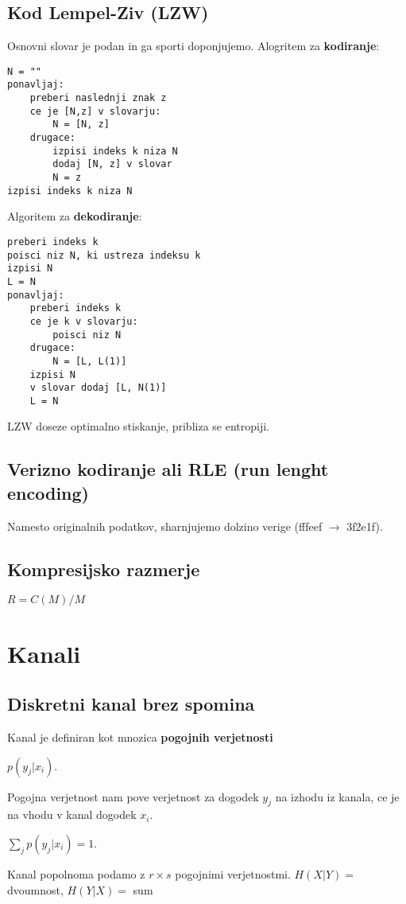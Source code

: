 \documentclass{article}
\begin{document}
\begin{multicols}{4}
	\subsection{Kod Lempel-Ziv (LZW)}
	Osnovni slovar je podan in ga sporti doponjujemo. Alogritem za \textbf{kodiranje}:
	\begin{verbatim}
N = ""
ponavljaj:
    preberi naslednji znak z
    ce je [N,z] v slovarju:
        N = [N, z]
    drugace:
        izpisi indeks k niza N
        dodaj [N, z] v slovar
        N = z
izpisi indeks k niza N
\end{verbatim}
	Algoritem za \textbf{dekodiranje}:
	\begin{verbatim}
preberi indeks k
poisci niz N, ki ustreza indeksu k
izpisi N
L = N
ponavljaj:
    preberi indeks k
    ce je k v slovarju:
        poisci niz N
    drugace:
        N = [L, L(1)]
    izpisi N
    v slovar dodaj [L, N(1)]
    L = N
\end{verbatim}
	LZW doseze optimalno stiskanje, pribliza se entropiji. %

	\subsection{Verizno kodiranje ali RLE (run lenght encoding)}
	Namesto originalnih podatkov, sharnjujemo dolzino verige (fffeef $\rightarrow$ 3f2e1f).

	\subsection{Kompresijsko razmerje}
	\begin{center}
		\begin{math}
			R = C(M) / M
		\end{math}
	\end{center}

	\section{Kanali}

	\subsection{Diskretni kanal brez spomina}
	Kanal je definiran kot mnozica \textbf{pogojnih verjetnosti}
	\begin{center}
		$p(y_j | x_i)$.
	\end{center}
	Pogojna verjetnost nam pove verjetnost za dogodek $y_j$ na izhodu iz kanala, ce je na vhodu v kanal dogodek $x_i$.
	\begin{center}
		\begin{math}
			\sum_j p(y_j | x_i) = 1.
		\end{math}
	\end{center}
	Kanal popolnoma podamo z $r \times s$ pogojnimi verjetnostmi.
	$H(X|Y) =$ dvoumnost, $H(Y|X) =$ sum


\end{multicols}
\end{document}
